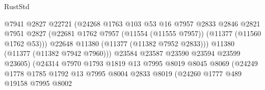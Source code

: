 \begin{lexlean}{RustStd}
\begin{coremodule}
                                        @7941
                                        @2827
                                        @22721
                                        (@24268
                                          @1763
                                          @103
                                          @53
                                          @16
                                          @7957
                                          @2833
                                          @2846
                                          @2821
                                          @7951
                                          @2827
                                          (@22681
                                            @1762
                                            @7957
                                            (@11554 (@11555 @7957))
                                            (@11377 (@11560 @1762 @53)))
                                          @22648
                                          @11380
                                          (@11377 (@11382 @7952 @2833)))
                                        @11380
                                        (@11377 (@11382 @7942 @7960)))
                                      @23584
                                      @23587
                                      @23590
                                      @23594
                                      @23599
                                      @23605)
                                    (@24314
                                      @7970
                                      @1793
                                      @1819
                                      @13
                                      @7995
                                      @8019
                                      @8045
                                      @8069
                                      (@24249
                                        @1778
                                        @1785
                                        @1792
                                        @13
                                        @7995
                                        @8004
                                        @2833
                                        @8019
                                        (@24260
                                          @1777
                                          @489
                                          @19158
                                          @7995
                                          @8002

\end{coremodule}
\end{lexlean}
